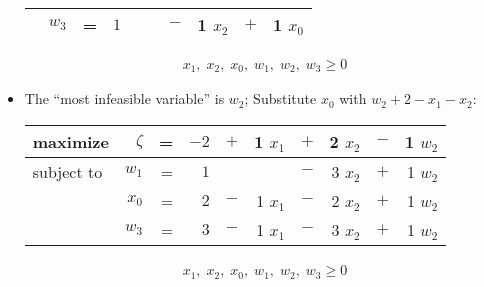 \documentclass[usenames,dvipsnames,8pt]{beamer}%
\begin{document}
\begin{frame}
\begin{columns}
\begin{column}{0.55\textwidth}
\begin{itemize}
\begin{table}[ht]
\begin{tabular}{lrrrcrcrcr}
                         & $w_3$ & = & $1$ & & & $-$ & 1 $x_2$ & $+$ & 1 $x_0$ \\ 
              \bottomrule
            \end{tabular}
          \end{table}
          \vspace{-0.4cm}
          \begin{align*}
            x_1,\;x_2,\;x_0,\;w_1,\;w_2,\;w_3\geqslant 0
          \end{align*}
        \item The ``most infeasible variable'' is $w_2$; Substitute $x_0$ with $w_2 + 2 - x_1 - x_2$:  
          \vspace{0.1cm}
          \begin{table}[ht]
            \centering
            \setlength\tabcolsep{2pt}
            \begin{tabular}{lrrrcrcrcr}
              \toprule
              maximize   &$\zeta$& = & $-2$ & $+$ & 1 $x_1$ & $+$ & 2 $x_2$ & $-$ & 1 $w_2$ \\
              \midrule
              subject to & $w_1$ & = & $1$ &  & & $-$ & 3 $x_2$ & $+$ & 1 $w_2$ \\
                         & $x_0$ & = & $2$ & $-$ & 1 $x_1$ & $-$ & 2 $x_2$ & $+$ & 1 $w_2$\\
                         & $w_3$ & = & $3$ & $-$ & 1 $x_1$ & $-$ & 3 $x_2$ & $+$ & 1 $w_2$ \\ 
              \bottomrule
            \end{tabular}
          \end{table}
          \vspace{-0.4cm}
          \begin{align*}
            x_1,\;x_2,\;x_0,\;w_1,\;w_2,\;w_3\geqslant 0
          \end{align*}
      \end{itemize}
    \end{column}
  \end{columns}
\end{frame}
\end{document}
